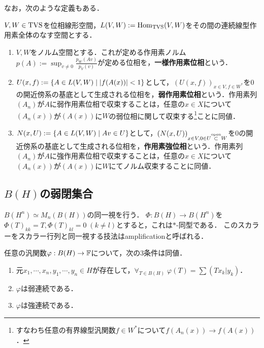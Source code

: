 \documentclass[uplatex,dvipdfmx]{jsreport}
\begin{document}
なお，次のような定義もある．

\begin{definition}
    $V,W\in\mathrm{TVS}$を位相線形空間，$L(V,W):=\mathrm{Hom}_{\mathrm{TVS}}(V,W)$をその間の連続線型作用素全体のなす空間とする．
    \begin{enumerate}
        \item $V,W$をノルム空間とする．これが定める作用素ノルム$p(A):=\sup_{v\ne0}\frac{p_W(Av)}{p_V(v)}$が定める位相を，\textbf{一様作用素位相}という．
        \item $U(x,f):=\left\{A\in L(V,W)\mid\lvert f(A(x))\rvert<1\right\}$として，$(U(x,f))_{x\in V,f\in W^*}$を$0$の開近傍系の基底として生成される位相を，\textbf{弱作用素位相}という．作用素列$(A_n)$が$A$に弱作用素位相で収束することは，任意の$x\in X$について$(A_n(x))$が$(A(x))$に$W$の弱位相に関して収束する\footnote{すなわち任意の有界線型汎関数$f\in W^*$について$f(A_n(x))\to f(A(x))$．}ことに同値．
        \item $N(x,U):=\left\{A\in L(V,W)\mid Av\in U\right\}$として，$(N(x,U))_{x\in V,0\in U\overset{\mathrm{open}}{\subset} W}$を$0$の開近傍系の基底として生成される位相を，\textbf{作用素強位相}という．作用素列$(A_n)$が$A$に強作用素位相で収束することは，任意の$x\in X$について$(A_n(x))$が$(A(x))$に$W$にてノルム収束することに同値．
    \end{enumerate}
\end{definition}

\subsection{$B(H)$の弱閉集合}

\begin{notation}
    $B(H^n)\simeq M_n(B(H))$の同一視を行う．
    $\Phi:B(H)\to B(H^n)$を$\Phi(T)_{kk}=T,\Phi(T)_{kl}=0\;(k\ne l)$とすると，これは$*$-同型である．
    このスカラーをスカラー行列と同一視する技法はamplificationと呼ばれる．
\end{notation}

\begin{proposition}
    任意の汎関数$\varphi:B(H)\to\mathbb{F}$について，次の3条件は同値．
    \begin{enumerate}
        \item 元$x_1,\cdots,x_n,y_1,\cdots,y_n\in H$が存在して，$\forall_{T\in B(H)}\;\varphi(T)=\sum(Tx_k|y_k)$．
        \item $\varphi$は弱連続である．
        \item $\varphi$は強連続である．
    \end{enumerate}
\end{proposition}
\end{document}
